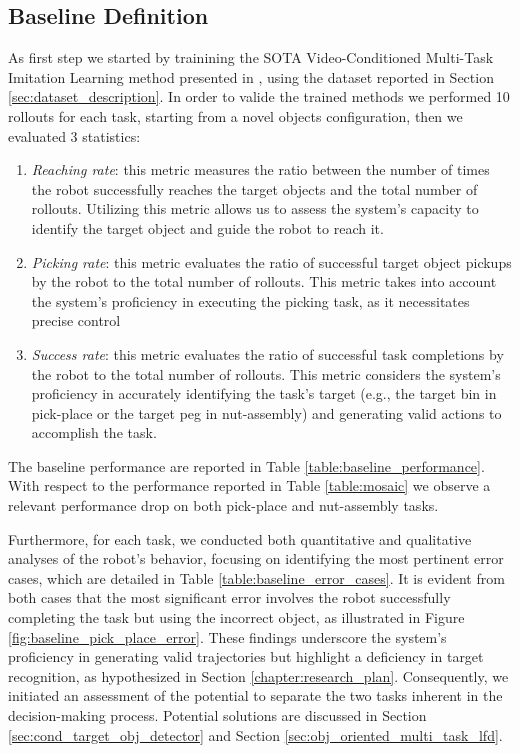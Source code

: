\subsection{Baseline Definition}
\label{sec:baseline_definition}
As first step we started by trainining the SOTA Video-Conditioned Multi-Task Imitation Learning method presented in \cite{mandi2022towards_more_generalizable_one_shot}, using the dataset reported in Section \ref{sec:dataset_description}. In order to valide the trained methods we performed 10 rollouts for each task, starting from a novel objects configuration, then we evaluated 3 statistics:
\begin{enumerate}
    \item \textit{Reaching rate}: this metric measures the ratio between the number of times the robot successfully reaches the target objects and the total number of rollouts. Utilizing this metric allows us to assess the system's capacity to identify the target object and guide the robot to reach it.
    \item \textit{Picking rate}: this metric evaluates the ratio of successful target object pickups by the robot to the total number of rollouts. This metric takes into account the system's proficiency in executing the picking task, as it necessitates precise control
    \item \textit{Success rate}: this metric evaluates the ratio of successful task completions by the robot to the total number of rollouts. This metric considers the system's proficiency in accurately identifying the task's target (e.g., the target bin in pick-place or the target peg in nut-assembly) and generating valid actions to accomplish the task.
\end{enumerate}
The baseline performance are reported in Table \ref{table:baseline_performance}. With respect to the performance reported in Table \ref{table:mosaic} we observe a relevant performance drop on both pick-place and nut-assembly tasks.

\newline Furthermore, for each task, we conducted both quantitative and qualitative analyses of the robot's behavior, focusing on identifying the most pertinent error cases, which are detailed in Table \ref{table:baseline_error_cases}. It is evident from both cases that the most significant error involves the robot successfully completing the task but using the incorrect object, as illustrated in Figure \ref{fig:baseline_pick_place_error}. These findings underscore the system's proficiency in generating valid trajectories but highlight a deficiency in target recognition, as hypothesized in Section \ref{chapter:research_plan}. Consequently, we initiated an assessment of the potential to separate the two tasks inherent in the decision-making process. Potential solutions are discussed in Section \ref{sec:cond_target_obj_detector} and Section \ref{sec:obj_oriented_multi_task_lfd}.


